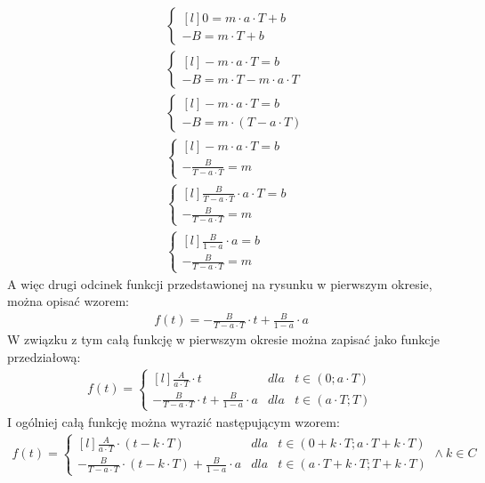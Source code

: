 \begin{task}
\begin{align*}
&\left\{\begin{matrix*}[l]
0 = m\cdot a \cdot T +b\\ 
-B = m\cdot T +b
\end{matrix*}\right. \\
&\left\{\begin{matrix*}[l]
-m \cdot a \cdot T = b\\ 
-B = m \cdot T -m \cdot a \cdot T
\end{matrix*}\right. \\
&\left\{\begin{matrix*}[l]
-m \cdot a \cdot T = b\\ 
-B = m \cdot \left( T - a \cdot T\right)
\end{matrix*}\right. \\
&\left\{\begin{matrix*}[l]
-m \cdot a \cdot T = b\\ 
-\frac{B}{T - a \cdot T} = m
\end{matrix*}\right. \\
&\left\{\begin{matrix*}[l]
\frac{B}{T - a \cdot T} \cdot a \cdot T = b\\ 
-\frac{B}{T - a \cdot T} = m
\end{matrix*}\right. \\
&\left\{\begin{matrix*}[l]
\frac{B}{1 - a} \cdot a = b\\ 
-\frac{B}{T - a \cdot T} = m
\end{matrix*}\right.
\end{align*}
A więc drugi odcinek funkcji przedstawionej na rysunku w pierwszym okresie, można opisać wzorem:
\begin{align*}
f(t) = -\frac{B}{T - a \cdot T}\cdot t + \frac{B}{1 - a} \cdot a
\end{align*}
W związku z tym całą funkcję w pierwszym okresie można zapisać jako funkcje przedziałową:
\begin{align*}
f(t) = \left\{\begin{matrix*}[l]
\frac{A}{a \cdot T}\cdot t & dla &t \in (0; a \cdot T)\\ 
-\frac{B}{T - a \cdot T}\cdot t + \frac{B}{1 - a} \cdot a & dla & t \in (a \cdot T; T)
\end{matrix*}\right.
\end{align*}
I ogólniej całą funkcję można wyrazić następującym wzorem:
\begin{align*}
f(t) = \left\{\begin{matrix*}[l]
\frac{A}{a \cdot T}\cdot \left( t - k\cdot T \right) & dla &t \in (0 + k\cdot T; a \cdot T + k\cdot T)\\ 
-\frac{B}{T - a \cdot T}\cdot \left( t - k\cdot T \right) + \frac{B}{1 - a} \cdot a & dla & t \in (a \cdot T+ k\cdot T; T+ k\cdot T)
\end{matrix*}\right. \wedge k \in C
\end{align*}


\end{task}
